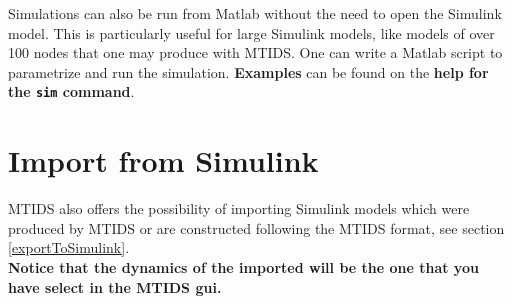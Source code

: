 \documentclass[a4paper,twoside, openright,12pt]{report}
\begin{document}
Simulations can also be run from Matlab without the need to open the Simulink model. This is particularly useful for large Simulink models, like models of over 100 nodes that
one may produce with MTIDS. One can write a Matlab script to parametrize  and run the simulation. \textbf{Examples} can be found on the \textbf{help for the \texttt{sim} command}.
% 
% 
% 
% 
% 
% 
% 
% 
% 

 


\section{Import from Simulink}

MTIDS also offers the possibility of importing Simulink models which were produced by MTIDS or are constructed following the MTIDS format, 
see section \ref{exportToSimulink}.\\

\textbf{Notice that the dynamics of the imported will be the one that you have select in the MTIDS gui.}
\\
\end{document}
